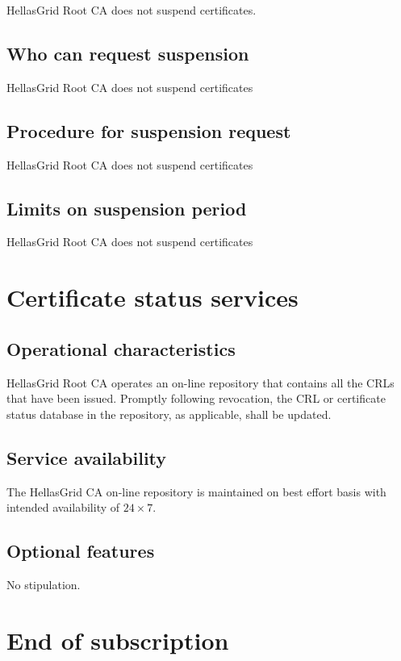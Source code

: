 \documentclass[11pt,a4paper,titlepage]{book}
\begin{document}
HellasGrid Root CA does not suspend certificates.

\subsection{Who can request suspension}

HellasGrid Root CA does not suspend certificates

\subsection{Procedure for suspension request}

HellasGrid Root CA does not suspend certificates

\subsection{Limits on suspension period}

HellasGrid Root CA does not suspend certificates

\section{Certificate status services}
\subsection{Operational characteristics}

HellasGrid Root CA operates an on-line repository that contains all the CRLs that have been issued. Promptly following revocation, the CRL or certificate status database in the repository, as applicable, shall be updated.

\subsection{Service availability}

The HellasGrid CA on-line repository is maintained on best effort basis with intended availability of $24\times 7$.

\subsection{Optional features}

No stipulation. 

\section{End of subscription}
\end{document}
